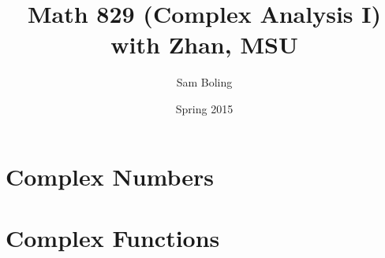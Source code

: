 \documentclass{report}
\title{Math 829 (Complex Analysis I) with Zhan, MSU}
\author{Sam Boling}
\date{Spring 2015}
\begin{document}
\maketitle

\chapter{Complex Numbers}



\chapter{Complex Functions}



\end{document}
